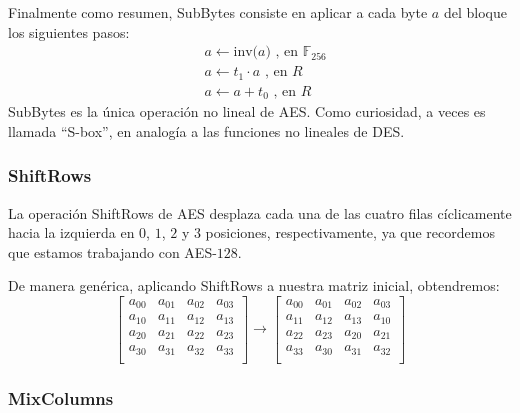     Finalmente como resumen, SubBytes consiste en aplicar a cada byte $a$ del bloque los siguientes pasos:
    \begin{align}
        &a \leftarrow \text{inv(}a\text{) , en } \mathbb{F}_{256} \\
        &a \leftarrow t_{1} \cdot a \text{ , en } R \\
        &a \leftarrow a + t_{0} \text{ , en } R
    \end{align}
    SubBytes es la única operación no lineal de AES. Como curiosidad, a veces es llamada ``S-box'', en analogía a las funciones no lineales de DES.

    \subsubsection{ShiftRows}
    
    La operación ShiftRows de AES desplaza cada una de las cuatro filas cíclicamente hacia la izquierda en $0$, $1$, $2$ y $3$ posiciones, respectivamente, ya que recordemos que estamos trabajando con AES-$128$.
    \begin{ejemplo}
        De manera genérica, aplicando ShiftRows a nuestra matriz inicial, obtendremos:
        \begin{equation}
            \begin{bmatrix}
                a_{00} & a_{01} & a_{02} & a_{03} \\
                a_{10} & a_{11} & a_{12} & a_{13} \\
                a_{20} & a_{21} & a_{22} & a_{23} \\
                a_{30} & a_{31} & a_{32} & a_{33} \\
            \end{bmatrix}
            \rightarrow
             \begin{bmatrix}
                a_{00} & a_{01} & a_{02} & a_{03} \\
                a_{11} & a_{12} & a_{13} & a_{10} \\
                a_{22} & a_{23} & a_{20} & a_{21} \\
                a_{33} & a_{30} & a_{31} & a_{32} \\
            \end{bmatrix}
        \end{equation}
    \end{ejemplo}

    \subsubsection{MixColumns}


